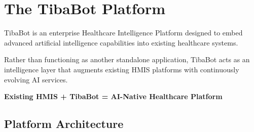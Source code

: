 
\chapter*{The TibaBot Platform}

TibaBot is an enterprise Healthcare Intelligence Platform designed to embed advanced artificial intelligence capabilities into existing healthcare systems.

Rather than functioning as another standalone application, TibaBot acts as an intelligence layer that augments existing HMIS platforms with continuously evolving AI services.

\vspace{6mm}

\begin{callout}

\centering

\Large

\textbf{Existing HMIS + TibaBot = AI-Native Healthcare Platform}

\end{callout}


\section{Platform Architecture}

